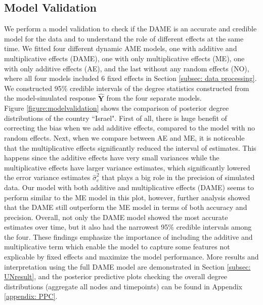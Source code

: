 \documentclass[a4paper]{article}
\begin{document}
\subsection{Model Validation}\label{subsec: Model Validation}
We perform a model validation to check if the DAME is an accurate and credible model for the data and to understand the role of different effects at the same time. We fitted four different dynamic AME models, one with additive and multiplicative effects (DAME), one with only multiplicative effects (ME), one with only additive effects (AE), and the last without any random effects (NO), where all four models included 6 fixed effects in Section \ref{subsec: data processing}. We constructed 95\% credible intervals of the degree statistics constructed from the model-simulated response $\hat{\mathbf{Y}}$ from the four separate models. \\ \newline
Figure \ref{figure:modelvalidation} shows the comparison of posterior degree distributions of the country ``Israel". First of all, there is huge benefit of correcting the bias when we add additive effects, compared to the model with no random effects. Next, when we compare between AE and ME, it is noticeable that the multiplicative effects significantly reduced the interval of estimates. This happens since the additive effects have very small variances while the multiplicative effects have larger variance estimates, which significantly lowered the error variance estimates $\hat\sigma_e^2$ that plays a big role in the precision of simulated data. Our model with both additive and multiplicative effects (DAME) seems to perform similar to the ME model in this plot, however, further analysis showed that the DAME still outperform the ME model in terms of both accuracy and precision. Overall, not only the DAME model showed the most accurate estimates over time, but it also had the narrowest 95\% credible intervals among the four. These findings emphasize the importance of including the additive and multiplicative term which enable the model to capture some features not explicable by fixed effects and maximize the model performance. More results and interpretation using the full DAME model are demonstrated in Section \ref{subsec: UNresult}, and the posterior predictive plots checking the overall degree distributions (aggregate all nodes and timepoints) can be found in Appendix \ref{appendix: PPC}.
\end{document}
